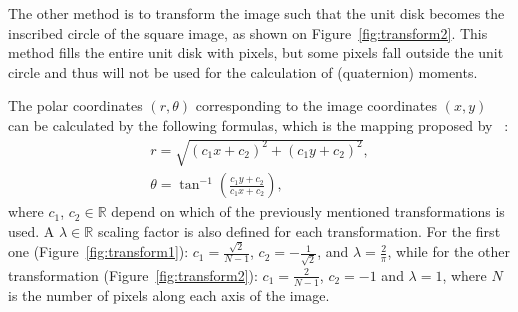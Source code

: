 The other method is to transform the image such that the unit disk becomes the inscribed circle of the square image, as shown on Figure~\ref{fig:transform2}. This method fills the entire unit disk with pixels, but some pixels fall outside the unit circle and thus will not be used for the calculation of (quaternion) moments.

The polar coordinates $(r,\theta)$ corresponding to the image coordinates $(x,y)$ can be calculated by the following formulas, which is the mapping proposed by \citeauthor{Chong}~\cite{Chong}:
\begin{gather*}
  r = \sqrt{(c_1x + c_2)^2 + (c_1y + c_2)^2}, \\
  \theta = \tan^{-1}\left(\frac{c_1y + c_2}{c_1x + c_2}\right),
\end{gather*}
where $c_1$, $c_2 \in \mathds{R}$ depend on which of the previously mentioned transformations is used. A $\lambda \in \mathds{R}$ scaling factor is also defined for each transformation.
For the first one (Figure~\ref{fig:transform1}): $c_1 = \frac{\sqrt{2}}{N - 1}$, $c_2 = -\frac{1}{\sqrt{2}}$, and $\lambda = \frac{2}{\pi}$, while for the other transformation (Figure~\ref{fig:transform2}): $c_1 = \frac{2}{N - 1}$, $c_2 = -1$ and $\lambda = 1$, where $N$ is the number of pixels along each axis of the image.
  
